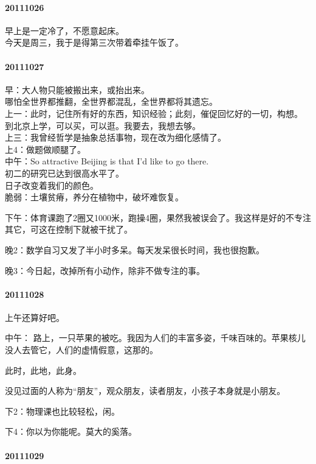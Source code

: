 \documentclass[UTF8]{book}
\begin{document}
\paragraph{20111026}
早上是一定冷了，不愿意起床。\\
今天是周三，我于是得第三次带着牵挂午饭了。

\paragraph{20111027}
早：大人物只能被搬出来，或抬出来。\\
哪怕全世界都推翻，全世界都混乱，全世界都将其遗忘。\\

上一：此时，记住所有好的东西，知识经验；此刻，催促回忆好的一切，构想。\\
到北京上学，可以买，可以逛。我要去，我想去够。\\

上三：我曾经哲学是抽象总括事物，现在改为细化感情了。\\

上4：做题做顺腿了。\\

中午：So attractive Beijing is that I'd like to go there.\\
初二的研究已达到很高水平了。\\
日子改变着我们的颜色。\\
脆弱：土壤贫瘠，养分在植物中，破坏难恢复。

下午：体育课跑了2圈又1000米，跑操4圈，果然我被误会了。我这样是好的不专注其它，可这在控制下就被干扰了。

晚2：数学自习又发了半小时多呆。每天发呆很长时间，我也很抱歉。

晚3：今日起，改掉所有小动作，除非不做专注的事。

\paragraph{20111028}
上午还算好吧。

中午： 路上，一只苹果的被吃。我因为人们的丰富多姿，千味百味的。苹果核儿没人去管它，人们的虚情假意，这那的。

此时，此地，此身。

没见过面的人称为“朋友”，观众朋友，读者朋友，小孩子本身就是小朋友。

下2：物理课也比较轻松，闲。

下4：你以为你能呢。莫大的奚落。


\paragraph{20111029}
\end{document}
